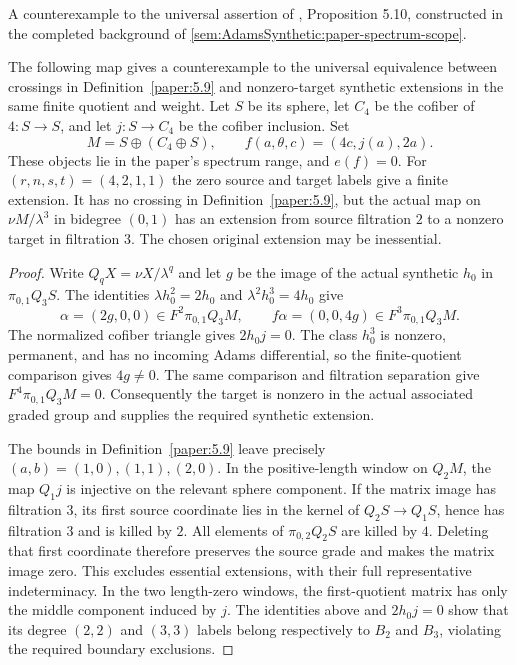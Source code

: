 \begin{theorem}
\label{sem:ProofTools:finite-crossing-counterexample}
A counterexample to the universal assertion of
\cite{LWX126}, Proposition 5.10, constructed in the completed background of
\ref{sem:AdamsSynthetic:paper-spectrum-scope}.

The following map gives a counterexample to the universal equivalence between
crossings in Definition~\ref{paper:5.9} and nonzero-target synthetic extensions
in the same finite quotient and weight. Let $S$ be its sphere, let $C_4$ be the cofiber of
$4:S\to S$, and let $j:S\to C_4$ be the cofiber inclusion. Set
\[
M=S\oplus(C_4\oplus S),\qquad f(a,\theta,c)=(4c,j(a),2a).
\]
These objects lie in the paper's spectrum range, and $e(f)=0$.
For $(r,n,s,t)=(4,2,1,1)$ the zero source and target labels give a
finite extension. It has no crossing in Definition~\ref{paper:5.9},
but the actual map on $\nu M/\lambda^3$ in bidegree $(0,1)$ has an
extension from source filtration $2$ to a nonzero target in filtration $3$.
The chosen original extension may be inessential.
\end{theorem}
\begin{proof}
Write $Q_qX=\nu X/\lambda^q$ and let $g$ be the image of the actual
synthetic $h_0$ in $\pi_{0,1}Q_3S$. The identities
$\lambda h_0^2=2h_0$ and $\lambda^2h_0^3=4h_0$ give
\[
\alpha=(2g,0,0)\in F^2\pi_{0,1}Q_3M,\qquad
f\alpha=(0,0,4g)\in F^3\pi_{0,1}Q_3M.
\]
The normalized cofiber triangle gives $2h_0j=0$. The class $h_0^3$
is nonzero, permanent, and has no incoming Adams differential, so the
finite-quotient comparison gives $4g\ne0$. The same comparison and
filtration separation give $F^4\pi_{0,1}Q_3M=0$. Consequently the target
is nonzero in the actual associated graded group and supplies the required
synthetic extension.

The bounds in Definition~\ref{paper:5.9} leave precisely
$(a,b)=(1,0),(1,1),(2,0)$. In the positive-length window on $Q_2M$,
the map $Q_1j$ is injective on the relevant sphere component. If the
matrix image has filtration $3$, its first source coordinate lies in the
kernel of $Q_2S\to Q_1S$, hence has filtration $3$ and is killed by $2$.
All elements of $\pi_{0,2}Q_2S$ are killed by $4$. Deleting that first
coordinate therefore preserves the source grade and makes the matrix image
zero. This excludes essential extensions, with their full representative
indeterminacy. In the two length-zero windows, the first-quotient matrix
has only the middle component induced by $j$. The identities above and
$2h_0j=0$ show that its degree $(2,2)$ and $(3,3)$ labels belong respectively
to $B_2$ and $B_3$, violating the required boundary exclusions.
\end{proof}


